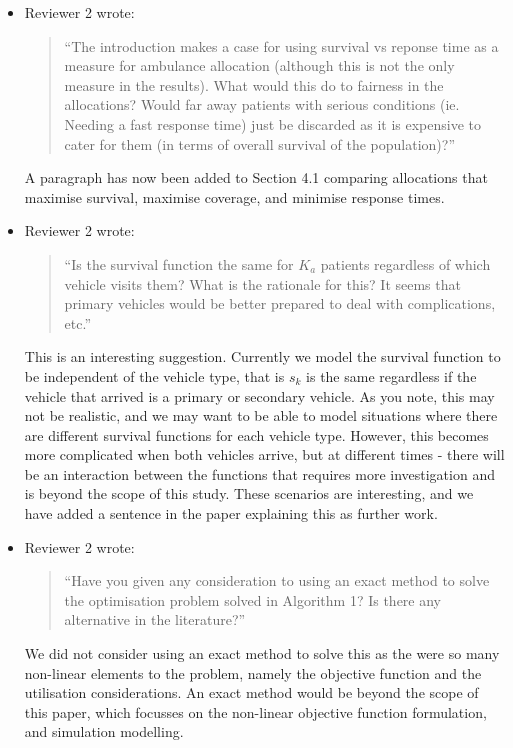 \documentclass{article}
\begin{document}
\begin{itemize}

\item Reviewer 2 wrote:
\begin{quote}
``The introduction makes a case for using survival vs reponse time as a measure for ambulance allocation (although this is not the only measure in the results). What would this do to fairness in the allocations? Would far away patients with serious conditions (ie. Needing a fast response time) just be discarded as it is expensive to cater for them (in terms of overall survival of the population)?''
\end{quote}
A paragraph has now been added to Section 4.1 comparing allocations that maximise survival, maximise coverage, and minimise response times.

\item Reviewer 2 wrote:
\begin{quote}
``Is the survival function the same for $K_a$ patients regardless of which vehicle visits them? What is the rationale for this? It seems that primary vehicles would be better prepared to deal with complications, etc.''
\end{quote}
This is an interesting suggestion. Currently we model the survival function to be independent of the vehicle type, that is $s_k$ is the same regardless if the vehicle that arrived is a primary or secondary vehicle. As you note, this may not be realistic, and we may want to be able to model situations where there are different survival functions for each vehicle type. However, this becomes more complicated when both vehicles arrive, but at different times - there will be an interaction between the functions that requires more investigation and is beyond the scope of this study. These scenarios are interesting, and we have added a sentence in the paper explaining this as further work.

\item Reviewer 2 wrote:
\begin{quote}
``Have you given any consideration to using an exact method to solve the optimisation problem solved in Algorithm 1? Is there any alternative in the literature?''
\end{quote}
We did not consider using an exact method to solve this as the were so many non-linear elements to the problem, namely the objective function and the utilisation considerations. An exact method would be beyond the scope of this paper, which focusses on the non-linear objective function formulation, and simulation modelling.


\end{itemize}
\end{document}
